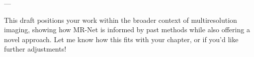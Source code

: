 
---

This draft positions your work within the broader context of multiresolution imaging, showing how MR-Net is informed by past methods while also offering a novel approach. Let me know how this fits with your chapter, or if you’d like further adjustments!